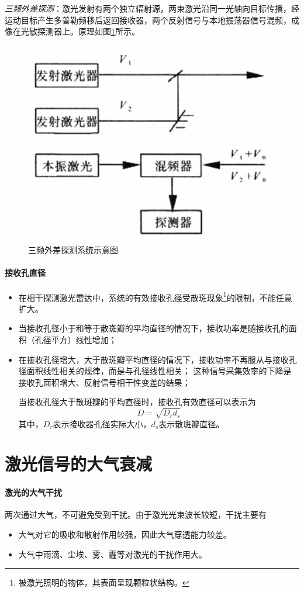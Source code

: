 \begin{enumerate}
		\textit{三频外差探测}：激光发射有两个独立辐射源，两束激光沿同一光轴向目标传播，经运动目标产生多普勒频移后返回接收器，两个反射信号与本地振荡器信号混频，成像在光敏探测器上。原理如图\ref{fig:三频外差探测系统示意图}所示。
		\begin{figure}[htbp]
			\centering
			\includegraphics[width=0.5\linewidth]{figure/Chapter2/三频外差探测系统示意图}
			\caption{三频外差探测系统示意图}
			\label{fig:三频外差探测系统示意图}
		\end{figure}
\end{enumerate} %

\paragraph{接收孔直径}
\begin{itemize}
	\item 在相干探测激光雷达中，系统的有效接收孔径受散斑现象\footnote{被激光照明的物体，其表面呈现颗粒状结构。}的限制，不能任意扩大。
	\item 当接收孔径小于和等于散斑瓣的平均直径的情况下，接收功率是随接收孔的面积（孔径平方）线性增加；
	\item 在接收孔径增大，大于散斑瓣平均直径的情况下，接收功率不再服从与接收孔径面积线性相关的规律，而是与孔径线性相关；
		这种信号采集效率的下降是接收孔面积增大、反射信号相干性变差的结果；
	
		当接收孔径大于散斑瓣的平均直径时，接收孔有效直径可以表示为
		\begin{equation}
		D = \sqrt{D_rd_s}
		\end{equation}
		其中，$ D_r $表示接收器孔径实际大小，$ d_s $表示散斑瓣直径。
\end{itemize}

\section{激光信号的大气衰减}

\paragraph{激光的大气干扰}两次通过大气，不可避免受到干扰。由于激光光束波长较短，干扰主要有
\begin{itemize}
	\item 大气对它的吸收和散射作用较强，因此大气穿透能力较差。
	\item 大气中雨滴、尘埃、雾、霾等对激光的干扰作用大。
\end{itemize} %

